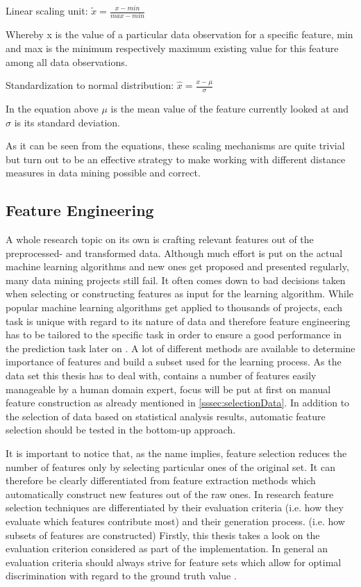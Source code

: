Linear scaling unit: $\tilde{x} = \frac{x - min}{max - min}$

Whereby x is the value of a particular data observation for a specific feature, min and max is the minimum respectively maximum existing value for this feature among all data observations. 

Standardization to normal distribution: $\hat{x} = \frac{x - \mu}{\sigma}$

In the equation above $\mu$ is the mean value of the feature currently looked at and $\sigma$ is its standard deviation.

As it can be seen from the equations, these scaling mechanisms are quite trivial but turn out to be an effective strategy to make working with different distance measures in data mining possible and correct.

\subsection{Feature Engineering}
\label{sssec:featureEngineering}
A whole research topic on its own is crafting relevant features out of the preprocessed- and transformed data. Although much effort is put on the actual machine learning algorithms and new ones get proposed and presented regularly, many data mining projects still fail. It often comes down to bad decisions taken when selecting or constructing features as input for the learning algorithm. While popular machine learning algorithms get applied to thousands of projects, each task is unique with regard to its nature of data and therefore feature engineering has to be tailored to the specific task in order to ensure a good performance in the prediction task later on \cite{domingos2012few}. A lot of different methods are available to determine importance of features and build a subset used for the learning process. As the data set this thesis has to deal with, contains a number of features easily manageable by a human domain expert, focus will be put at first on manual feature construction as already mentioned in \ref{sssec:selectionData}. In addition to the selection of data based on statistical analysis results, automatic feature selection should be tested in the bottom-up approach. 

It is important to notice that, as the name implies, feature selection reduces the number of features only by selecting particular ones of the original set. It can therefore be clearly differentiated from feature extraction methods which automatically construct new features out of the raw ones. In research feature selection techniques are differentiated by their evaluation criteria (i.e. how they evaluate which features contribute most) and their generation process. (i.e. how subsets of features are constructed) Firstly, this thesis takes a look on the evaluation criterion considered as part of the implementation. In general an evaluation criteria should always strive for feature sets which allow for optimal discrimination with regard to the ground truth value \cite{dash1997feature}. 

